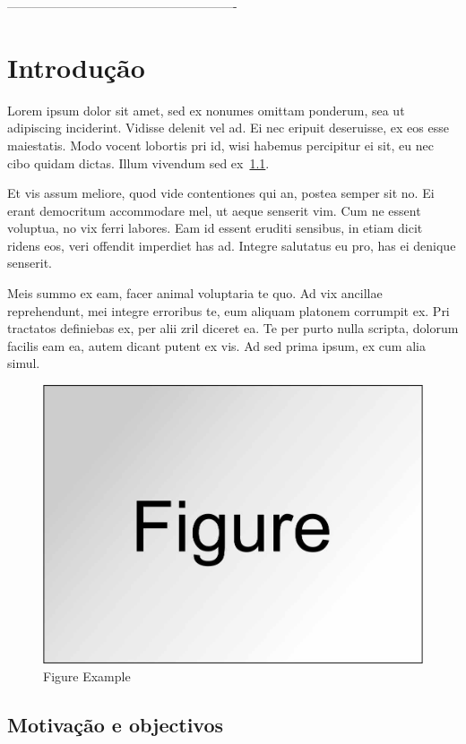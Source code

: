 
-------------------------------------------------------
\chapter{Introdução}
\label{Ch:Introducao}
Lorem ipsum dolor sit amet, sed ex nonumes omittam ponderum, sea ut adipiscing inciderint. Vidisse delenit vel ad. Ei nec eripuit deseruisse, ex eos esse maiestatis. Modo vocent lobortis pri id, wisi habemus percipitur ei sit, eu nec cibo quidam dictas. Illum vivendum sed ex~\ref{Fig:FigExample}.

Et vis assum meliore, quod vide contentiones qui an, postea semper sit no. Ei erant democritum accommodare mel, ut aeque senserit vim. Cum ne essent voluptua, no vix ferri labores. Eam id essent eruditi sensibus, in etiam dicit ridens eos, veri offendit imperdiet has ad. Integre salutatus eu pro, has ei denique senserit.

Meis summo ex eam, facer animal voluptaria te quo. Ad vix ancillae reprehendunt, mei integre erroribus te, eum aliquam platonem corrumpit ex. Pri tractatos definiebas ex, per alii zril diceret ea. Te per purto nulla scripta, dolorum facilis eam ea, autem dicant putent ex vis. Ad sed prima ipsum, ex cum alia simul.


\begin{figure}
\centering
\includegraphics[width=0.7\linewidth]{Cap1/Figure.jpg} 
\caption{Figure Example}
\label{Fig:FigExample}
\end{figure}

\section{Motivação e objectivos}

